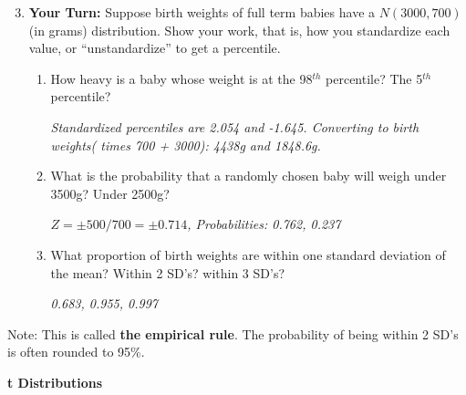 \begin{enumerate}
\setcounter{enumi}{2}
\item {\bf Your Turn:} Suppose birth weights of full term babies have
  a $N(3000, 700)$ (in grams) distribution. Show your work, that is,
  how you standardize each value, or ``unstandardize'' to get a
  percentile.
\begin{enumerate}
\item 
  How heavy is a baby whose weight is at the  98$^{th}$
  percentile? The 5$^{th}$ percentile? 
\begin{students}
        \vspace{1cm}        
\end{students}

\begin{key}
{\it Standardized percentiles are 2.054 and -1.645.  Converting to
    birth 
    weights( times 700 + 3000): 4438g and 1848.6g. }
\end{key}

\item What is the probability that a randomly chosen baby will weigh
  under 3500g?  Under 2500g?
\begin{students}
        \vspace{1cm}        
\end{students}

\begin{key}
 {\it $Z = \pm 500/700 = \pm 0.714$, Probabilities: 0.762, 0.237}
\end{key}
\item What proportion of birth weights are within one standard deviation of the  mean? Within 2 SD's? within 3 SD's?
\begin{students}
        \vspace{.5cm}        
\end{students}

\begin{key}
 {\it 0.683, 0.955, 0.997 }
\end{key}

  \end{enumerate}
\end{enumerate}

Note: This is called {\bf the empirical rule}.  The probability of being within
2 SD's is often rounded to 95\%.
\begin{students}

\end{students}

\begin{center}
  {\Large\bf t Distributions}
\end{center}

